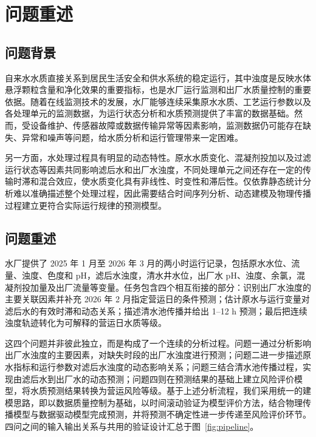 \documentclass[UTF8,12pt,a4paper]{ctexart}
\begin{document}
\section{问题重述}
\subsection{问题背景}
自来水水质直接关系到居民生活安全和供水系统的稳定运行，其中浊度是反映水体悬浮颗粒含量和净化效果的重要指标，也是水厂运行监测和出厂水质量控制的重要依据。随着在线监测技术的发展，水厂能够连续采集原水水质、工艺运行参数以及各处理单元的监测数据，为运行状态分析和水质预测提供了丰富的数据基础。然而，受设备维护、传感器故障或数据传输异常等因素影响，监测数据仍可能存在缺失、异常和噪声等问题，给水质分析和运行管理带来一定困难。

另一方面，水处理过程具有明显的动态特性。原水水质变化、混凝剂投加以及过滤运行状态等因素共同影响滤后水和出厂水浊度，不同处理单元之间还存在一定的传输时滞和混合效应，使水质变化具有非线性、时变性和滞后性。仅依靠静态统计分析难以准确描述整个处理过程，因此需要结合时间序列分析、动态建模及物理传播过程建立更符合实际运行规律的预测模型。

\subsection{问题重述}
水厂提供了 2025 年 1 月至 2026 年 3 月的两小时运行记录，包括原水水位、流量、浊度、色度和 pH，滤后水浊度，清水井水位，出厂水 pH、浊度、余氯，混凝剂投加量及出厂流量等变量。任务包含四个相互衔接的部分：识别出厂水浊度的主要关联因素并补充 2026 年 2 月指定营运日的条件预测；估计原水与运行变量对滤后水的有效时滞和动态关系；描述清水池传播并给出 1--12 h 预测；最后把连续浊度轨迹转化为可解释的营运日水质等级。

这四个问题并非彼此独立，而是构成了一个连续的分析过程。问题一通过分析影响出厂水浊度的主要因素，对缺失时段的出厂水浊度进行预测；问题二进一步描述原水指标和运行参数对滤后水浊度的动态影响关系；问题三结合清水池传播过程，实现由滤后水到出厂水的动态预测；问题四则在预测结果的基础上建立风险评价模型，将水质预测结果转换为营运风险等级。基于上述分析流程，我们采用统一的建模思路，即以数据质量控制为基础，以时间滚动验证为模型评价方法，结合物理传播模型与数据驱动模型完成预测，并将预测不确定性进一步传递至风险评价环节。四问之间的输入输出关系与共用的验证设计汇总于图~\ref{fig:pipeline}。
\end{document}
